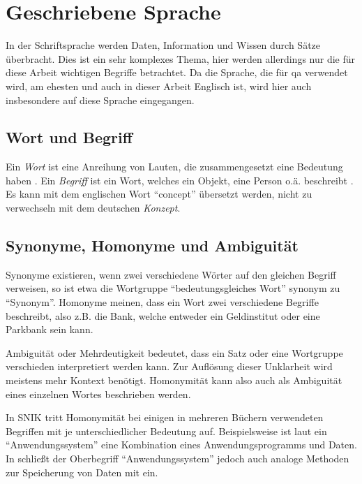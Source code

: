 \section{Geschriebene Sprache}
In der Schriftsprache werden Daten, Information und Wissen durch Sätze überbracht.
Dies ist ein sehr komplexes Thema, hier werden allerdings nur die für diese Arbeit wichtigen Begriffe betrachtet.
Da die Sprache, die für \ac{qa} verwendet wird, am ehesten und auch in dieser Arbeit Englisch ist,
wird hier auch insbesondere auf diese Sprache eingegangen.

\subsection{Wort und Begriff}

Ein \emph{Wort} ist eine Anreihung von Lauten, die zusammengesetzt eine Bedeutung haben \citep[S.~1185]{duden}.
Ein \emph{Begriff} ist ein Wort, welches ein Objekt, eine Person o.ä. beschreibt \citep[S.~235]{duden}.
Es kann mit dem englischen Wort \enquote{concept} übersetzt werden, nicht zu verwechseln mit dem deutschen \emph{Konzept}.

\subsection{Synonyme, Homonyme und Ambiguität}

Synonyme existieren, wenn zwei verschiedene Wörter auf den gleichen Begriff verweisen, so ist etwa die Wortgruppe \enquote{bedeutungsgleiches Wort} synonym zu \enquote{Synonym}.
Homonyme meinen, dass ein Wort zwei verschiedene Begriffe beschreibt, also z.B. die Bank, welche entweder ein Geldinstitut oder eine Parkbank sein kann.

Ambiguität oder Mehrdeutigkeit bedeutet, dass ein Satz oder eine Wortgruppe verschieden interpretiert werden kann.
Zur Auflösung dieser Unklarheit wird meistens mehr Kontext benötigt.
Homonymität kann also auch als Ambiguität eines einzelnen Wortes beschrieben werden.

In SNIK tritt Homonymität bei einigen in mehreren Büchern verwendeten Begriffen mit je unterschiedlicher Bedeutung auf.
Beispielsweise ist laut \citet{he} ein \enquote{Anwendungssystem} eine Kombination eines Anwendungsprogramms und Daten.
In \citet{ob} schließt der Oberbegriff \enquote{Anwendungssystem} jedoch auch analoge Methoden zur Speicherung von Daten mit ein.

